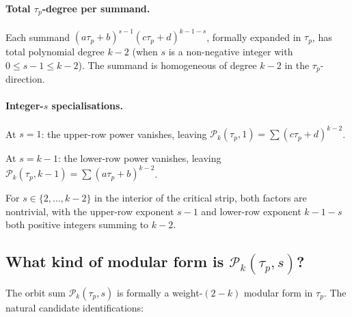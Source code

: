 \documentclass[11pt]{article}
\begin{document}
\paragraph{Total $\tau_p$-degree per summand.}
Each summand $(a\tau_p + b)^{s - 1}(c\tau_p + d)^{k - 1 - s}$, formally
expanded in $\tau_p$, has total polynomial degree $k - 2$ (when $s$
is a non-negative integer with $0 \le s - 1 \le k - 2$).  The
summand is homogeneous of degree $k - 2$ in the $\tau_p$-direction.

\paragraph{Integer-$s$ specialisations.}
At $s = 1$: the upper-row power vanishes, leaving
$\mathcal{P}_k(\tau_p, 1) = \sum (c\tau_p + d)^{k - 2}$.

At $s = k - 1$: the lower-row power vanishes, leaving
$\mathcal{P}_k(\tau_p, k - 1) = \sum (a\tau_p + b)^{k - 2}$.

For $s \in \{2, \ldots, k - 2\}$ in the interior of the critical strip,
both factors are nontrivial, with the upper-row exponent $s - 1$ and
lower-row exponent $k - 1 - s$ both positive integers summing to
$k - 2$.

\subsection{What kind of modular form is $\mathcal{P}_k(\tau_p, s)$?}\label{subsec:Pk-identification}

The orbit sum $\mathcal{P}_k(\tau_p, s)$ is formally a weight-$(2 - k)$
modular form in $\tau_p$.  The natural candidate identifications:
\end{document}
